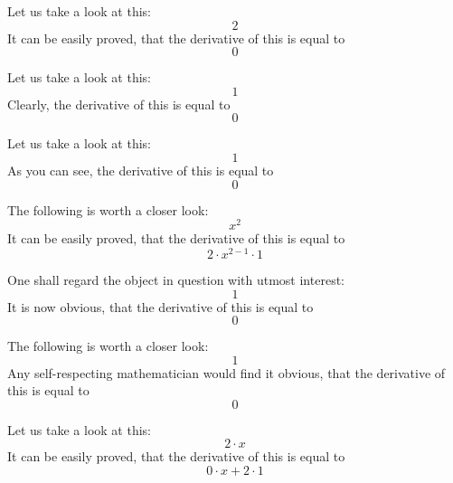 \documentclass{article}
\begin{document}
Let us take a look at this:
\begin{equation}
2 
\end{equation}
It can be easily proved, that the derivative of this is equal to
\begin{equation}
0 
\end{equation}

Let us take a look at this:
\begin{equation}
1 
\end{equation}
Clearly, the derivative of this is equal to
\begin{equation}
0 
\end{equation}

Let us take a look at this:
\begin{equation}
1 
\end{equation}
As you can see, the derivative of this is equal to
\begin{equation}
0 
\end{equation}

The following is worth a closer look:
\begin{equation}
x ^{2 } 
\end{equation}
It can be easily proved, that the derivative of this is equal to
\begin{equation}
2 \cdot x ^{2 - 1 } \cdot 1 
\end{equation}

One shall regard the object in question with utmost interest:
\begin{equation}
1 
\end{equation}
It is now obvious, that the derivative of this is equal to
\begin{equation}
0 
\end{equation}

The following is worth a closer look:
\begin{equation}
1 
\end{equation}
Any self-respecting mathematician would find it obvious, that the derivative of this is equal to
\begin{equation}
0 
\end{equation}

Let us take a look at this:
\begin{equation}
2 \cdot x 
\end{equation}
It can be easily proved, that the derivative of this is equal to
\begin{equation}
0 \cdot x + 2 \cdot 1 
\end{equation}
\end{document}
